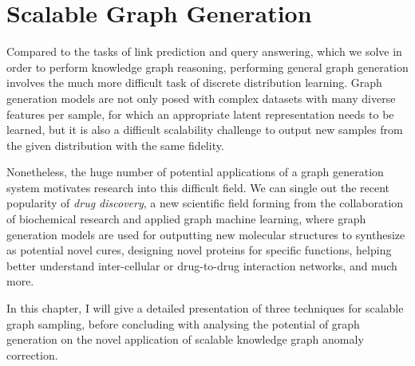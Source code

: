 \chapter{Scalable Graph Generation}
\label{chp: generation}

Compared to the tasks of link prediction and query answering, which we solve in order to perform knowledge graph reasoning, performing general graph generation involves the much more difficult task of discrete distribution learning. Graph generation models are not only posed with complex datasets with many diverse features per sample, for which an appropriate latent representation needs to be learned, but it is also a difficult scalability challenge to output new samples from the given distribution with the same fidelity. 

Nonetheless, the huge number of potential applications of a graph generation system motivates research into this difficult field. We can single out the recent popularity of \emph{drug discovery}, a new scientific field forming from the collaboration of biochemical research and applied graph machine learning, where graph generation models are used for outputting new molecular structures to synthesize as potential novel cures, designing novel proteins for specific functions, helping better understand inter-cellular or drug-to-drug interaction networks, and much more.

In this chapter, I will give a detailed presentation of three techniques for scalable graph sampling, before concluding with analysing the potential of graph generation on the novel application of scalable knowledge graph anomaly correction.







